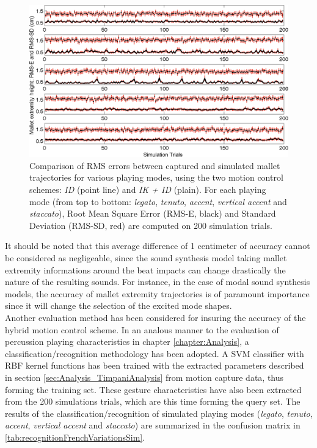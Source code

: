 \begin{figure}[H]
	\begin{center}
		\includegraphics[width=\linewidth]{Chapters/5/Pics/Pdf/RMSE-RMSD.pdf}
	\end{center}
	\vspace{-0.5cm}
	\caption[Comparison of RMS errors between captured and simulated mallet trajectories for various playing modes]{Comparison of RMS errors between captured and simulated mallet trajectories for various playing modes, using the two motion control schemes: \emph{ID} (point line) and \emph{IK + ID} (plain). For each playing mode (from top to bottom: \emph{legato}, \emph{tenuto}, \emph{accent}, \emph{vertical accent} and \emph{staccato}), Root Mean Square Error (RMS-E, black) and Standard Deviation (RMS-SD, red) are computed on 200 simulation trials.}
	\label{fig:rms}
\end{figure}

It should be noted that this average difference of 1 centimeter of accuracy cannot be considered as negligeable, since the sound synthesis model taking mallet extremity informations around the beat impacts can change drastically the nature of the resulting sounds. For instance, in the case of modal sound synthesis models, the accuracy of mallet extremity trajectories is of paramount importance since it will change the selection of the excited mode shapes.\\

Another evaluation method has been considered for insuring the accuracy of the hybrid motion control scheme. In an analous manner to the evaluation of percussion playing characteristics in chapter \ref{chapter:Analysis}, a classification/recognition methodology has been adopted. A SVM classifier with RBF kernel functions has been trained with the extracted parameters described in section \ref{sec:Analysis_TimpaniAnalysis} from motion capture data, thus forming the training set. These gesture characteristics have also been extracted from the 200 simulations trials, which are this time forming the query set. The results of the classification/recognition of simulated playing modes (\emph{legato}, \emph{tenuto}, \emph{accent}, \emph{vertical accent} and \emph{staccato}) are summarized in the confusion matrix in \mytabname \ref{tab:recognitionFrenchVariationsSim}.
 
